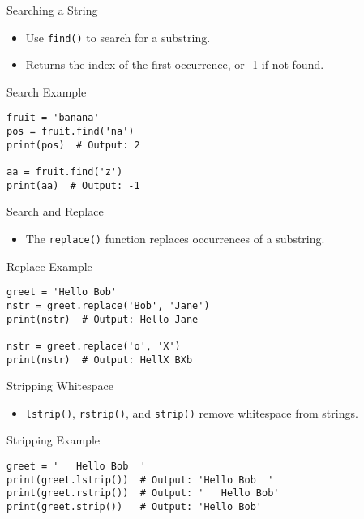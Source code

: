 \documentclass[serif, aspectratio=169]{beamer}
\begin{document}
\begin{frame}{Searching a String}
    \begin{itemize}
        \item Use \texttt{find()} to search for a substring.
        \item Returns the index of the first occurrence, or -1 if not found.
    \end{itemize}
\end{frame}

\begin{frame}[fragile]{Search Example}
    \begin{lstlisting}
fruit = 'banana'
pos = fruit.find('na')
print(pos)  # Output: 2

aa = fruit.find('z')
print(aa)  # Output: -1
    \end{lstlisting}
\end{frame}

\begin{frame}{Search and Replace}
    \begin{itemize}
        \item The \texttt{replace()} function replaces occurrences of a substring.
    \end{itemize}
\end{frame}

\begin{frame}[fragile]{Replace Example}
    \begin{lstlisting}
greet = 'Hello Bob'
nstr = greet.replace('Bob', 'Jane')
print(nstr)  # Output: Hello Jane

nstr = greet.replace('o', 'X')
print(nstr)  # Output: HellX BXb
    \end{lstlisting}
\end{frame}

\begin{frame}{Stripping Whitespace}
    \begin{itemize}
        \item \texttt{lstrip()}, \texttt{rstrip()}, and \texttt{strip()} remove whitespace from strings.
    \end{itemize}
\end{frame}

\begin{frame}[fragile]{Stripping Example}
    \begin{lstlisting}
greet = '   Hello Bob  '
print(greet.lstrip())  # Output: 'Hello Bob  '
print(greet.rstrip())  # Output: '   Hello Bob'
print(greet.strip())   # Output: 'Hello Bob'
    \end{lstlisting}
\end{frame}
\end{document}
